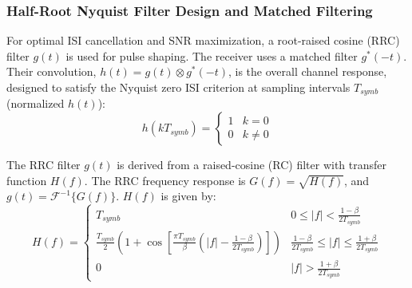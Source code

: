 \documentclass[11pt]{article}
\begin{document}
	\subsubsection{Half-Root Nyquist Filter Design and Matched Filtering}
	For optimal ISI cancellation and SNR maximization, a root-raised cosine (RRC) filter $g(t)$ is used for pulse shaping. The receiver uses a matched filter $g^*(-t)$. Their convolution, $h(t) = g(t) \otimes g^*(-t)$, is the overall channel response, designed to satisfy the Nyquist zero ISI criterion at sampling intervals $T_{symb}$ (normalized $h(t)$):
	\begin{equation}
		h(kT_{symb}) = \begin{cases}
			1 & k=0 \\
			0 & k \neq 0
		\end{cases}
		\label{eq:nyquist_criterion_part1}
	\end{equation}
	\par
	The RRC filter $g(t)$ is derived from a raised-cosine (RC) filter with transfer function $H(f)$. The RRC frequency response is $G(f) = \sqrt{H(f)}$, and $g(t) = \mathcal{F}^{-1}\{G(f)\}$. $H(f)$ is given by:
	\begin{equation}
		H(f) = \begin{cases}
			T_{symb} & 0 \le |f| < \frac{1-\beta}{2T_{symb}} \\      
			\frac{T_{symb}}{2} \left(1 + \cos\left[\frac{\pi T_{symb}}{\beta}\left(|f| - \frac{1-\beta}{2T_{symb}}\right)\right]\right) & \frac{1-\beta}{2T_{symb}} \le |f| \le \frac{1+\beta}{2T_{symb}} \\      
			0 & |f| > \frac{1+\beta}{2T_{symb}}
		\end{cases}
		\label{eq:rc_response_part1}
	\end{equation}
	
\end{document}
